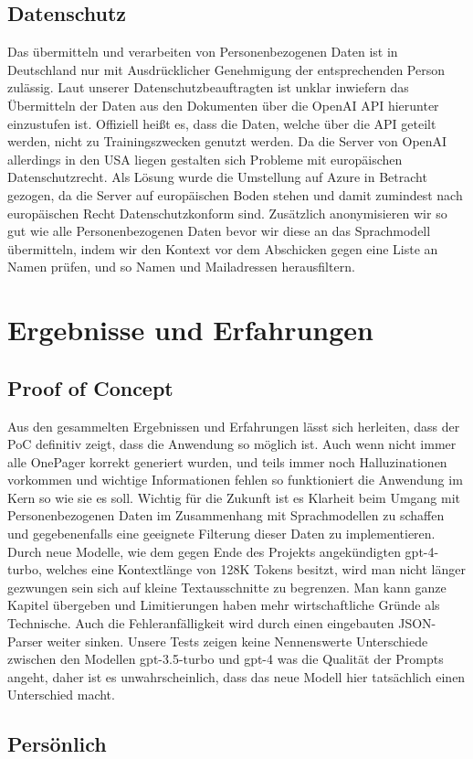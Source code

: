 \subsection{Datenschutz}
Das übermitteln und verarbeiten von Personenbezogenen Daten ist in Deutschland nur mit Ausdrücklicher Genehmigung der 
entsprechenden Person zulässig. Laut unserer Datenschutzbeauftragten ist unklar inwiefern das Übermitteln der Daten aus den Dokumenten über die OpenAI 
API hierunter einzustufen ist. Offiziell heißt es, dass die Daten, welche über die API geteilt werden, nicht zu 
Trainingszwecken genutzt werden. Da die Server von OpenAI allerdings in den USA liegen gestalten sich Probleme mit 
europäischen Datenschutzrecht. Als Lösung wurde die Umstellung auf Azure in Betracht gezogen, da die Server auf europäischen 
Boden stehen und damit zumindest nach europäischen Recht Datenschutzkonform sind. 
Zusätzlich anonymisieren wir so gut wie alle Personenbezogenen Daten bevor wir diese an das Sprachmodell übermitteln, indem 
wir den Kontext vor dem Abschicken gegen eine Liste an Namen prüfen, und so Namen und Mailadressen herausfiltern.

\section{Ergebnisse und Erfahrungen}

\subsection{Proof of Concept}
Aus den gesammelten Ergebnissen und Erfahrungen lässt sich herleiten, dass der PoC definitiv zeigt, dass die Anwendung so möglich ist.
Auch wenn nicht immer alle OnePager korrekt generiert wurden, und teils immer noch Halluzinationen vorkommen und wichtige Informationen 
fehlen so funktioniert die Anwendung im Kern so wie sie es soll. Wichtig für die Zukunft ist es Klarheit beim Umgang mit Personenbezogenen 
Daten im Zusammenhang mit Sprachmodellen zu schaffen und gegebenenfalls eine geeignete Filterung dieser Daten zu implementieren.
Durch neue Modelle, wie dem gegen Ende des Projekts angekündigten gpt-4-turbo, welches eine Kontextlänge von 128K Tokens besitzt, wird man 
nicht länger gezwungen sein sich auf kleine Textausschnitte zu begrenzen. Man kann ganze Kapitel übergeben und Limitierungen haben mehr wirtschaftliche 
Gründe als Technische. Auch die Fehleranfälligkeit wird durch einen eingebauten JSON-Parser weiter sinken.
Unsere Tests zeigen keine Nennenswerte Unterschiede zwischen den Modellen gpt-3.5-turbo und gpt-4 was die Qualität der Prompts angeht,
daher ist es unwahrscheinlich, dass das neue Modell hier tatsächlich einen Unterschied macht.

\subsection{Persönlich}